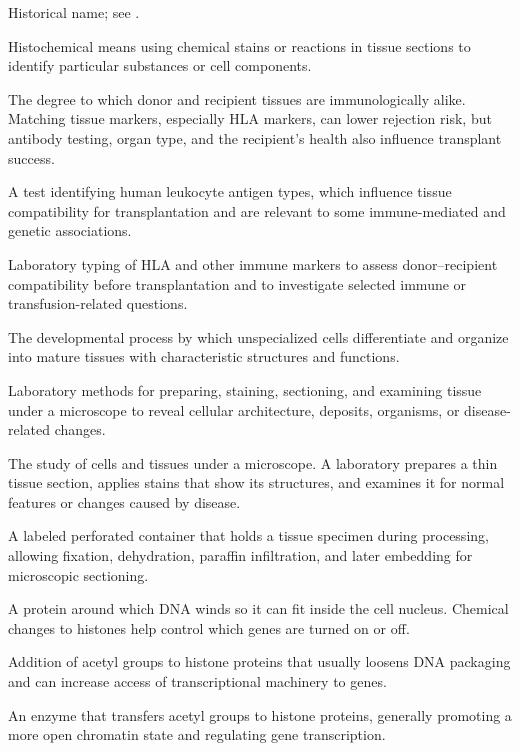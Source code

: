  Historical name; see .

 Histochemical means using chemical stains or reactions in tissue sections to identify particular substances or cell components.

 The degree to which donor and recipient tissues are immunologically alike. Matching tissue markers, especially HLA markers, can lower rejection risk, but antibody testing, organ type, and the recipient's health also influence transplant success.

 A test identifying human leukocyte antigen types, which influence tissue compatibility for transplantation and are relevant to some immune-mediated and genetic associations.

 Laboratory typing of HLA and other immune markers to assess donor--recipient compatibility before transplantation and to investigate selected immune or transfusion-related questions.

 The developmental process by which unspecialized cells differentiate and organize into mature tissues with characteristic structures and functions.

 Laboratory methods for preparing, staining, sectioning, and examining tissue under a microscope to reveal cellular architecture, deposits, organisms, or disease-related changes.

 The study of cells and tissues under a microscope. A laboratory prepares a thin tissue section, applies stains that show its structures, and examines it for normal features or changes caused by disease.

 A labeled perforated container that holds a tissue specimen during processing, allowing fixation, dehydration, paraffin infiltration, and later embedding for microscopic sectioning.

 A protein around which DNA winds so it can fit inside the cell nucleus. Chemical changes to histones help control which genes are turned on or off.

 Addition of acetyl groups to histone proteins that usually loosens DNA packaging and can increase access of transcriptional machinery to genes.

 An enzyme that transfers acetyl groups to histone proteins, generally promoting a more open chromatin state and regulating gene transcription.

